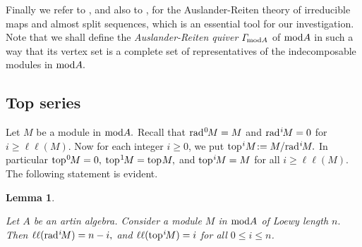 \documentclass[10pt]{amsart}
\newtheorem{Lemma}[Theo]{Lemma}
\theoremstyle{definition}
\newcommand{\mmod}{{\rm mod}}
\newcommand{\rad}{{\rm rad}\hspace{.5pt}}
\newcommand{\ntop}{{\rm top}\hspace{.5pt}}
\def\Ga{\hbox{$\mathit\Gamma\hspace{-2pt}$}}
\begin{document}
Finally we refer to \cite[Chapter V]{ARS}, and also to \cite{AuR1,AuR2,Bau}, for the Auslander-Reiten theory of irreducible maps and almost split sequences, which is an essential tool for our investigation. Note that we shall define the {\it Auslander-Reiten quiver} $\Ga_{\mmod A}$ of $\mmod A$ in such a way that its vertex set is a complete set of representatives of the indecomposable modules in $\mmod A.$ 

\subsection{\sc Top series} Let $M$ be a module in $\mmod A.$ Recall that 
$\rad^0\hspace{-1pt}M=M$ and $\rad^i\hspace{-1pt}M=0$ for $i\ge \ell\ell(M).$ Now for each integer $i\ge 0$, we put $\ntop^iM\hspace{-2pt}:=M/\rad^i\hspace{-1pt}M.$ In particular $\ntop^0\hspace{-1pt}M=0,$ $\ntop^1\hspace{-1pt}M=\ntop M,$ and $\ntop^i\hspace{-1pt}M=M$ for all $i\ge \ell\ell(M).$ The following statement is evident.

\begin{Lemma}\label{topi_LL}

Let $A$ be an artin algebra. Consider a module $M$ in $\mmod A$ of Loewy length $n.$ Then $\ell\ell(\rad^i\hspace{-1.2pt}M)=n-i,$ and $\ell\ell(\ntop^i\hspace{-1.2pt}M)=i$ for all $0\le i\le n$.

\end{Lemma}

\end{document}
